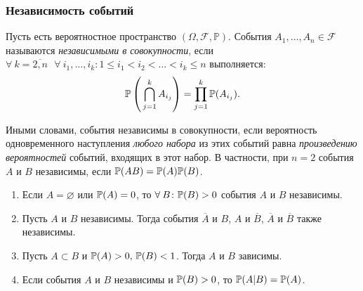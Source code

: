 \subsubsection{Независимость событий}
\begin{defn}
    Пусть есть вероятностное пространство $(\Omega, \mathcal{F}, \mathbb{P})$. 
    События $A_1, \ldots, A_n \in \mathcal{F}$ называются \textit{независимыми в совокупности}, если \\ 
    $\forall\: k = \overline{2, n} ~~~ \forall\: i_{1}, \ldots, i_{k} \colon 1 \leqslant i_1 < i_2 < \ldots < i_k \leqslant n$ выполняется:
    \begin{equation*}
        \mathbb{P}\left(\, \bigcap\limits_{j=1}^k A_{i_j}\right) = \prod\limits_{j=1}^k {\mathbb{P}(A_{i_j})}.
    \end{equation*}

    Иными словами, события независимы в совокупности, если вероятность одновременного наступления \textit{любого набора} из этих событий равна \textit{произведению вероятностей} событий, входящих в этот набор. 
    В частности, при $n = 2$ события $A$ и $B$ независимы, если ${\mathbb{P}(AB)} = {\mathbb{P}(A)}{\mathbb{P}(B)}$.
\end{defn}

\begin{namedthm}\leavevmode
    \begin{enumerate}
        \item 
            Если $A = \varnothing$ или ${\mathbb{P}(A)} = 0$, то $\forall \: B \colon {\mathbb{P}(B)} > 0$ события $A$ и $B$ независимы.
        \item 
            Пусть $A$ и $B$ независимы. Тогда события $\overline{A}$ и $B$, $A$ и $\overline{B}$, $\overline{A}$ и $\overline{B}$ также независимы. 
        \item 
            Пусть $A \subset B$ и ${\mathbb{P}(A)} > 0, \, {\mathbb{P}(B)} < 1$. Тогда $A$ и $B$ зависимы. 
        \item 
            Если события $A$ и $B$ независимы и ${\mathbb{P}(B)} > 0$, то ${\mathbb{P}(A|B)} = {\mathbb{P}(A)}$.
    \end{enumerate}
\end{namedthm}

